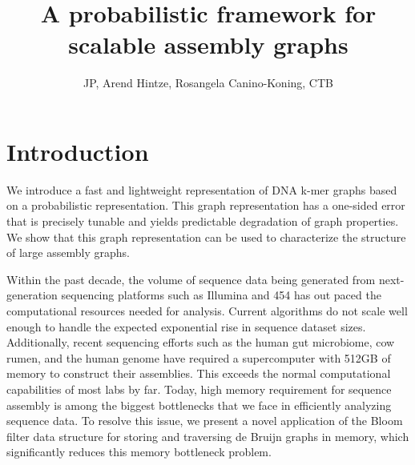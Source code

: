 \documentclass[12pt]{article} \usepackage{simplemargins}
\begin{document}
\title{A probabilistic framework for scalable assembly graphs}
\author{JP, Arend Hintze, Rosangela Canino-Koning, CTB}

\maketitle

\section{Introduction}

We introduce a fast and lightweight representation of DNA k-mer graphs
based on a probabilistic representation.  This graph representation has a one-sided
error that is precisely tunable and yields predictable degradation of
graph properties.  We show that this graph representation can be used
to characterize the structure of large assembly graphs.

Within the past decade, the volume of sequence data being generated
from next-generation sequencing platforms such as Illumina and 454 
 has out paced the computational resources needed for
analysis. Current algorithms do not scale well
enough to handle the expected exponential rise in sequence dataset
sizes. Additionally, recent sequencing efforts such as the human gut
microbiome\cite{pmid20203603}, cow rumen\cite{pmid21273488}, and the 
human genome\cite{pmid21187386} have required a
supercomputer with 512GB of memory to construct their
assemblies. This exceeds the normal computational capabilities of most labs by far.
Today, high memory requirement for sequence assembly is
among the biggest bottlenecks that we face in efficiently analyzing
sequence data. To resolve this issue, we present a novel application
of the Bloom filter data structure\cite{bloom} for storing and traversing de
Bruijn graphs in memory, which significantly reduces this
memory bottleneck problem.
\end{document}
